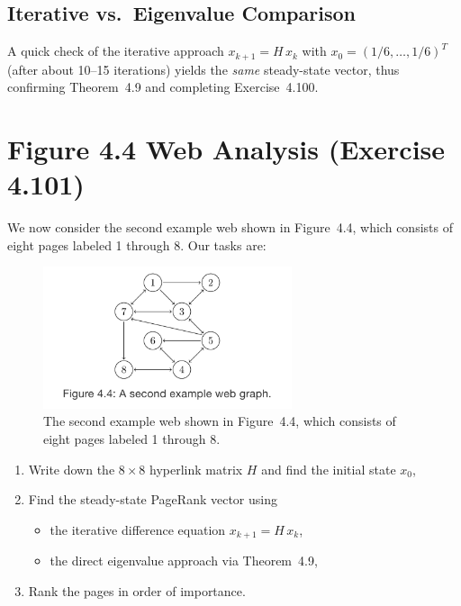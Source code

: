 \documentclass{article}
\begin{document}
\subsection*{Iterative vs.\ Eigenvalue Comparison}
A quick check of the iterative approach 
$x_{k+1} = H \, x_k$ with $x_0 = (1/6, \ldots, 1/6)^T$ 
(after about 10--15 iterations) yields the 
\emph{same} steady-state vector, thus confirming 
Theorem~4.9 and completing Exercise~4.100.



\section{Figure 4.4 Web Analysis (Exercise 4.101)}

We now consider the second example web shown in Figure~4.4, which consists of 
eight pages labeled 1 through 8. Our tasks are:

\begin{figure}[h]
  \centering
  \includegraphics[width=0.65\textwidth]{img/Node_Tree_4.4.png}
  \caption{%
   The second example web shown in Figure~4.4, which consists of eight pages labeled 1 through 8.
  }
  \label{fig:Node_Tree_4.4}
\end{figure}

\begin{enumerate}
  \item Write down the $8\times 8$ hyperlink matrix $H$ and find the initial state $x_0$,
  \item Find the steady-state PageRank vector using 
    \begin{itemize}
      \item the iterative difference equation $x_{k+1} = H\,x_k$, 
      \item the direct eigenvalue approach via Theorem~4.9,
    \end{itemize}
  \item Rank the pages in order of importance.
\end{enumerate}
\end{document}
